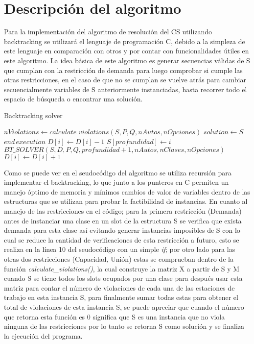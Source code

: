 \documentclass[letter, 10pt]{article}
\begin{document}
\section{Descripci\'on del algoritmo}
Para la implementaci\'on del algoritmo de resoluci\'on del CS utilizando backtracking se utilizar\'a el lenguaje de programaci\'on C, debido a la simpleza de este lenguaje en comparaci\'on con otros y por contar con funcionalidades \'utiles en este algoritmo. La idea b\'asica de este algoritmo es generar secuencias v\'alidas de S que cumplan con la restricci\'on de demanda para luego comprobar si cumple las otras restricciones, en el caso de que no se cumplan se vuelve atr\'as para cambiar secuencialmente variables de S anteriormente instanciadas, hasta recorrer todo el espacio de b\'usqueda o encontrar una soluci\'on.
\begin{algorithm}[H]
\caption{Backtracking solver}\label{alg:cap}
\begin{algorithmic}[1]
    \State $nViolations \gets calculate\_violations(S, P, Q, nAutos, nOpciones)$
        \State $solution \gets S$
        \State $end \hspace{2pt}execution$
    \EndIf
\Else
        \State $D[i] \gets D[i] - 1$ 
        \State $S[profundidad] \gets i$
        \State $BT\_SOLVER(S, D,P,Q, profundidad + 1, nAutos, nClases,nOpciones)$
        \State $D[i] \gets D[i] + 1$ 
    \EndIf
    \EndFor
\EndIf
\EndFunction
\end{algorithmic}
\end{algorithm}
Como se puede ver en el seudoc\'odigo del algoritmo se utiliza recursi\'on para implementar el backtracking, lo que junto a los punteros en C permiten un manejo \'optimo de memoria y m\'inimos cambios de valor de variables dentro de las estructuras que se utilizan para probar la factibilidad de instancias. En cuanto al manejo de las restricciones en el c\'odigo; para la primera restricci\'on (Demanda) antes de instanciar una clase en un slot de la estructura S se verifica que exista demanda para esta clase as\'i evitando generar instancias imposibles de S con lo cual se reduce la cantidad de verificaciones de esta restricci\'on a futuro, esto se realiza en la l\'inea 10 del seudoc\'odigo con un simple \textit{if}; por otro lado para las otras dos restricciones (Capacidad, Uni\'on) estas se comprueban dentro de la funci\'on \textit{calculate\_violations()}, la cual construye la matriz X a partir de S y M cuando S se tiene todos los slots ocupados por una clase para despu\'es usar esta matriz para contar el n\'umero de violaciones de cada una de las estaciones de trabajo en esta instancia S, para finalmente sumar todas estas para obtener el total de violaciones de esta instancia S, se puede apreciar que cuando el n\'umero que retorna esta funci\'on es 0 significa que S es una instancia que no viola ninguna de las restricciones por lo tanto se retorna S como soluci\'on y se finaliza la ejecuci\'on del programa.\\\\
\end{document}
